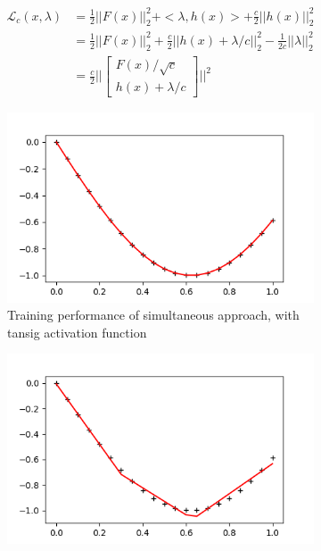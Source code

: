\begin{equation}
	\begin{aligned}
		\mathcal{L}_c(x,\lambda)
		&= \frac{1}{2} ||F(x)||^2_2 + <\lambda,h(x)> + \frac{c}{2} || h(x) ||^2_2 \\
		&= \frac{1}{2} ||F(x)||^2_2 + \frac{c}{2} ||h(x) + \lambda/c ||^2_2 - \frac{1}{2c} ||\lambda||^2_2 \\
		&= \frac{c}{2} \Big|\Big|
		\begin{bmatrix}
			F(x)/\sqrt{c} \\
			h(x) + \lambda/c
		\end{bmatrix} \Big|\Big|^2
	\end{aligned}
	\label{loss}
\end{equation}

\begin{figure}
     \centering
     \begin{subfigure}[b]{0.8\textwidth}
         \centering
         \includegraphics[width=\textwidth]{alm-tanh}
         \caption{Training performance of simultaneous approach, with tansig activation function}
         \label{alm-tanh}
     \end{subfigure}
     \begin{subfigure}[b]{0.8\textwidth}
         \centering
         \includegraphics[width=\textwidth]{alm-relu}

\end{subfigure}
\end{figure}
